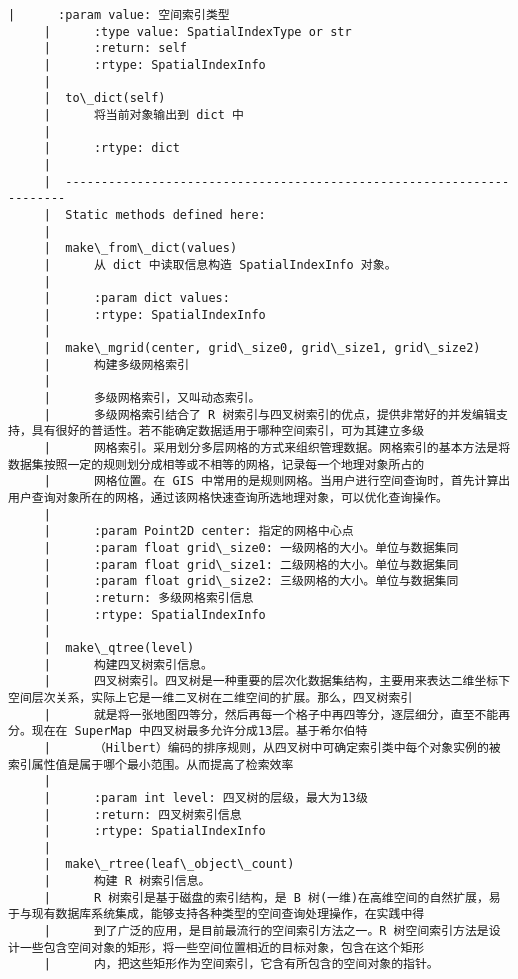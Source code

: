 \documentclass[11pt]{article}
\begin{document}
\begin{Verbatim}[commandchars=\\\{\}]
     |      :param value: 空间索引类型
     |      :type value: SpatialIndexType or str
     |      :return: self
     |      :rtype: SpatialIndexInfo
     |  
     |  to\_dict(self)
     |      将当前对象输出到 dict 中
     |      
     |      :rtype: dict
     |  
     |  ----------------------------------------------------------------------
     |  Static methods defined here:
     |  
     |  make\_from\_dict(values)
     |      从 dict 中读取信息构造 SpatialIndexInfo 对象。
     |      
     |      :param dict values:
     |      :rtype: SpatialIndexInfo
     |  
     |  make\_mgrid(center, grid\_size0, grid\_size1, grid\_size2)
     |      构建多级网格索引
     |      
     |      多级网格索引，又叫动态索引。
     |      多级网格索引结合了 R 树索引与四叉树索引的优点，提供非常好的并发编辑支持，具有很好的普适性。若不能确定数据适用于哪种空间索引，可为其建立多级
     |      网格索引。采用划分多层网格的方式来组织管理数据。网格索引的基本方法是将数据集按照一定的规则划分成相等或不相等的网格，记录每一个地理对象所占的
     |      网格位置。在 GIS 中常用的是规则网格。当用户进行空间查询时，首先计算出用户查询对象所在的网格，通过该网格快速查询所选地理对象，可以优化查询操作。
     |      
     |      :param Point2D center: 指定的网格中心点
     |      :param float grid\_size0: 一级网格的大小。单位与数据集同
     |      :param float grid\_size1: 二级网格的大小。单位与数据集同
     |      :param float grid\_size2: 三级网格的大小。单位与数据集同
     |      :return: 多级网格索引信息
     |      :rtype: SpatialIndexInfo
     |  
     |  make\_qtree(level)
     |      构建四叉树索引信息。
     |      四叉树索引。四叉树是一种重要的层次化数据集结构，主要用来表达二维坐标下空间层次关系，实际上它是一维二叉树在二维空间的扩展。那么，四叉树索引
     |      就是将一张地图四等分，然后再每一个格子中再四等分，逐层细分，直至不能再分。现在在 SuperMap 中四叉树最多允许分成13层。基于希尔伯特
     |      （Hilbert）编码的排序规则，从四叉树中可确定索引类中每个对象实例的被索引属性值是属于哪个最小范围。从而提高了检索效率
     |      
     |      :param int level: 四叉树的层级，最大为13级
     |      :return: 四叉树索引信息
     |      :rtype: SpatialIndexInfo
     |  
     |  make\_rtree(leaf\_object\_count)
     |      构建 R 树索引信息。
     |      R 树索引是基于磁盘的索引结构，是 B 树(一维)在高维空间的自然扩展，易于与现有数据库系统集成，能够支持各种类型的空间查询处理操作，在实践中得
     |      到了广泛的应用，是目前最流行的空间索引方法之一。R 树空间索引方法是设计一些包含空间对象的矩形，将一些空间位置相近的目标对象，包含在这个矩形
     |      内，把这些矩形作为空间索引，它含有所包含的空间对象的指针。

\end{Verbatim}
\end{document}
